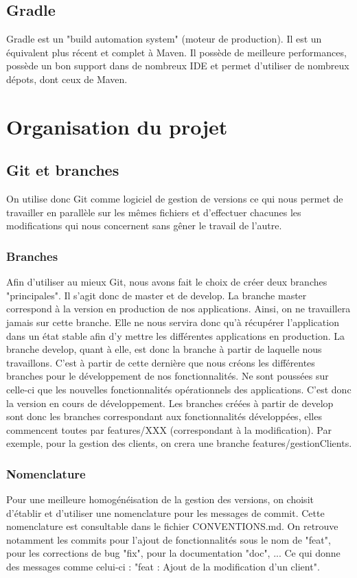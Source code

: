 		\subsection{Gradle}
			Gradle est un "build automation system" (moteur de production). Il est un équivalent plus récent et complet à Maven. Il possède de meilleure performances, possède un bon support dans de nombreux IDE et permet d'utiliser de nombreux dépots, dont ceux de Maven.

	\section{Organisation du projet}
		\subsection{Git et branches}
			On utilise donc Git comme logiciel de gestion de versions ce qui nous permet de travailler en parallèle sur les mêmes fichiers et d'effectuer chacunes les modifications qui nous concernent sans gêner le travail de l'autre.
			\subsubsection{Branches}
				Afin d'utiliser au mieux Git, nous avons fait le choix de créer deux branches "principales". Il s'agit donc de master et de develop.
				La branche master correspond à la version en production de nos applications. Ainsi, on ne travaillera jamais sur cette branche. Elle ne nous servira donc qu'à récupérer l'application dans un état stable afin d'y mettre les différentes applications en production.
				La branche develop, quant à elle, est donc la branche à partir de laquelle nous travaillons. C'est à partir de cette dernière que nous créons les différentes branches pour le développement de nos fonctionnalités. Ne sont poussées sur celle-ci que les nouvelles fonctionnalités opérationnels des applications. C'est donc la version en cours de développement.
				Les branches créées à partir de develop sont donc les branches correspondant aux fonctionnalités développées, elles commencent toutes par features/XXX (correspondant à la modification). Par exemple, pour la gestion des clients, on crera une branche features/gestionClients.

			\subsubsection{Nomenclature}
				Pour une meilleure homogénéisation de la gestion des versions, on choisit d'établir et d'utiliser une nomenclature pour les messages de commit. Cette nomenclature est consultable dans le fichier CONVENTIONS.md.
				On retrouve notamment les commits pour l'ajout de fonctionnalités sous le nom de "feat", pour les corrections de bug "fix", pour la documentation "doc", ...
				Ce qui donne des messages comme celui-ci : "feat : Ajout de la modification d'un client".


